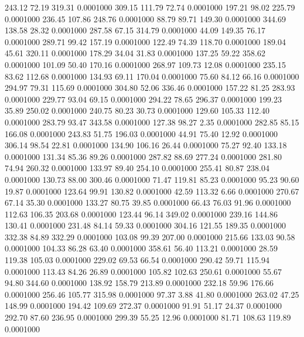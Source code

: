  243.12   72.19  319.31   0.0001000
 309.15  111.79   72.74   0.0001000
 197.21   98.02  225.79   0.0001000
 236.45  107.86  248.76   0.0001000
  88.79   89.71  149.30   0.0001000
 344.69  138.58   28.32   0.0001000
 287.58   67.15  314.79   0.0001000
  44.09  149.35   76.17   0.0001000
 289.71   99.42  157.19   0.0001000
 122.49   74.39  118.70   0.0001000
 189.04   45.61  320.11   0.0001000
 178.29   34.04   31.83   0.0001000
 137.25   59.22  358.62   0.0001000
 101.09   50.40  170.16   0.0001000
 268.97  109.73   12.08   0.0001000
 235.15   83.62  112.68   0.0001000
 134.93   69.11  170.04   0.0001000
  75.60   84.12   66.16   0.0001000
 294.97   79.31  115.69   0.0001000
 304.80   52.06  336.46   0.0001000
 157.22   81.25  283.93   0.0001000
 229.77   93.04   69.15   0.0001000
 294.22   78.65  296.37   0.0001000
 199.23   35.89  250.02   0.0001000
 240.75   80.23   30.73   0.0001000
 129.60  105.33  112.40   0.0001000
 283.79   93.47  343.58   0.0001000
 127.38   98.27    2.35   0.0001000
 282.85   85.15  166.08   0.0001000
 243.83   51.75  196.03   0.0001000
  44.91   75.40   12.92   0.0001000
 306.14   98.54   22.81   0.0001000
 134.90  106.16   26.44   0.0001000
  75.27   92.40  133.18   0.0001000
 131.34   85.36   89.26   0.0001000
 287.82   88.69  277.24   0.0001000
 281.80   74.94  260.32   0.0001000
 133.97   89.40  254.10   0.0001000
 255.41   80.87  238.04   0.0001000
 130.73   88.00  300.46   0.0001000
  71.47  119.81   85.23   0.0001000
  95.23   90.60   19.87   0.0001000
 123.64   99.91  130.82   0.0001000
  42.59  113.32    6.66   0.0001000
 270.67   67.14   35.30   0.0001000
 133.27   80.75   39.85   0.0001000
  66.43   76.03   91.96   0.0001000
 112.63  106.35  203.68   0.0001000
 123.44   96.14  349.02   0.0001000
 239.16  144.86  130.41   0.0001000
 231.48   84.14   59.33   0.0001000
 304.16  121.55  189.35   0.0001000
 332.38   84.89  332.29   0.0001000
 103.08   99.39  207.00   0.0001000
 215.66  133.03   90.58   0.0001000
 104.33   86.28   63.40   0.0001000
 358.61   56.40  113.21   0.0001000
  28.59  119.38  105.03   0.0001000
 229.02   69.53   66.54   0.0001000
 290.42   59.71  115.94   0.0001000
 113.43   84.26   26.89   0.0001000
 105.82  102.63  250.61   0.0001000
  55.67   94.80  344.60   0.0001000
 138.92  158.79  213.89   0.0001000
 232.18   59.96  176.66   0.0001000
 256.46  105.77  315.98   0.0001000
  97.37    3.88   41.80   0.0001000
 263.02   47.25  148.99   0.0001000
 194.42  109.69  272.37   0.0001000
  91.91   51.17   24.37   0.0001000
 292.70   87.60  236.95   0.0001000
 299.39   55.25   12.96   0.0001000
  81.71  108.63  119.89   0.0001000
